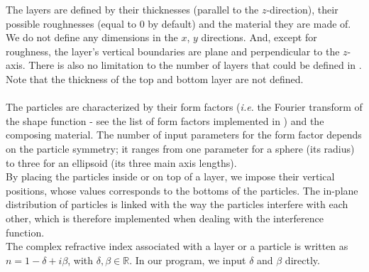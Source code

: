 \noindent The layers are defined by their thicknesses (parallel to the
$z$-direction), their possible
roughnesses (equal to 0 by default) and the
material they are made of. We do not define any dimensions in the $x$, $y$
directions. And, except for roughness, the layer's vertical boundaries are plane and
perpendicular to the $z$-axis. There is also no limitation to the
number of layers that could be defined in \BornAgain. Note that the
thickness of the top and bottom layer are not defined. \\

\\

\noindent The particles are characterized by their form factors (\textit{i.e.} the Fourier transform of the shape function - see the list of form factors implemented
  in \BornAgain) and the composing material. The number of input parameters for the form
  factor depends on the
  particle symmetry; it ranges from one parameter for a sphere (its
  radius) to three for an ellipsoid (its three main axis lengths).\\ By
  placing the particles
inside or on top of a layer, we impose their vertical positions, whose
values corresponds to the bottoms of the particles. The in-plane distribution of particles is linked with the way the
particles interfere with each other, which is therefore implemented
when dealing with the interference function. \\


\noindent The complex refractive index associated with a layer or a particle is written as $n=1-\delta +i\beta$, with
$\delta, \beta \in \mathbb{R}$. In our program, we input $\delta$ and
$\beta$ directly.

